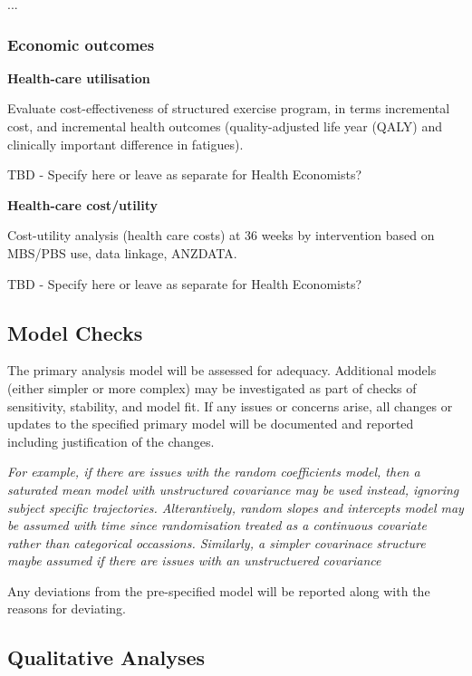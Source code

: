 \documentclass[
]{article}
\begin{document}
...

\hypertarget{economic-outcomes}{%
  \subsubsection{Economic outcomes}\label{economic-outcomes}}

\textbf{Health-care utilisation}

Evaluate cost-effectiveness of structured exercise program, in terms incremental cost, and incremental health outcomes (quality-adjusted life year (QALY) and clinically important difference in fatigues).

TBD - Specify here or leave as separate for Health Economists?

\textbf{Health-care cost/utility}

Cost-utility analysis (health care costs) at 36 weeks by intervention based on MBS/PBS use, data linkage, ANZDATA.

TBD - Specify here or leave as separate for Health Economists?


\hypertarget{model-checks}{
\subsection{Model Checks}\label{model-checks}}

The primary analysis model will be assessed for adequacy.
Additional models (either simpler or more complex) may be investigated as part of checks of sensitivity, stability, and model fit.
If any issues or concerns arise, all changes or updates to the specified primary model will be documented and reported including justification of the changes.

\textit{
For example, if there are issues with the random coefficients model, then a saturated mean model with unstructured covariance may be used instead, ignoring subject specific trajectories.
Alterantively, random slopes and intercepts model may be assumed with time since randomisation treated as a continuous covariate rather than categorical occassions.
Similarly, a simpler covarinace structure maybe assumed if there are issues with an unstructuered covariance
}

Any deviations from the pre-specified model will be reported along with the reasons for deviating.


\hypertarget{qualitative-analyses}{%
  \subsection{Qualitative Analyses}\label{qualitative-analyses}}
\end{document}
